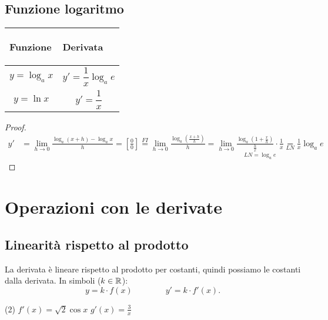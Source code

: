 \documentclass{book}     %
\begin{document}
\subsection{Funzione logaritmo}
\begin{center}
    \begin{tabular}{m{}|m{}}
        \begin{center}
            \textbf{Funzione}
        \end{center}
        & 
        \begin{center}
            \textbf{Derivata}
        \end{center}\\
        \hline
            \[y=\log_a x\]&
            \[y'=\frac{1}{x} \log_a e\] \\
            \[y=\ln x\] & 
            \[y'=\frac{1}{x}\]
    \end{tabular}
\end{center}
\begin{proof}
    \[\begin{aligned}y'&=\lim_{h\to 0}\frac{\log_a(x+h)-\log_a x}{h}=\left[ \frac{0}{0} \right]\overset{FI}{=}\lim_{h\to 0}\frac{\log_a\left(\frac{x+h}{h}\right)}{h}=\lim_{h\to 0}\underset{LN=\log_a e}{\boxed{\frac{\log_a\left(1+\frac{x}{h}\right)}{\frac{h}{x}}}\cdot\frac{1}{x} }\underset{LN}=\frac{1}{x}\log_ae\end{aligned}\]
\end{proof}

\section{Operazioni con le derivate}
    \subsection{Linearità rispetto al prodotto}
    La derivata è lineare rispetto al prodotto per costanti, quindi possiamo  le costanti dalla derivata. In simboli ($k\in\mathbb{R}$):
    \[y=k\cdot f(x)\qquad \qquad y'=k\cdot f'(x).\]
    \begin{ex}[Calcolare la derivata delle seguenti funzioni: 
        \begin{tasks}(2)
            \task $f(x)=\sqrt{2}\sin x$
            \task $g(x)=3\ln x$
        \end{tasks}
        ]
        \begin{tasks}(2)
            \task $f'(x)=\sqrt{2}\cos x$
            \task $g'(x)=\frac{3}{x}$
        \end{tasks}
    \end{ex}
\end{document}
